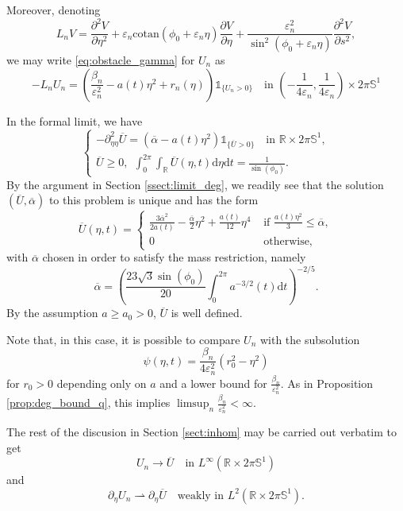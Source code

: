 \documentclass[10pt,a4paper]{article}
\newcommand{\RR}{\mathbb{R}}
\newcommand{\faskip}{\hspace{8pt}}
\numberwithin{equation}{section}
\begin{document}
	Moreover, denoting
	\[
		L_n V =  \frac{\partial^{2} V}{\partial \eta^{2}} + \varepsilon_n \text{cotan}(\phi_0 + \varepsilon_n\eta) \frac{\partial V}{\partial \eta} + \frac{\varepsilon_n^2}{\sin^2(\phi_0 + \varepsilon_n \eta)} \frac{\partial^{2} V}{\partial s^2},
	\]
	we may write \eqref{eq:obstacle_gamma} for $ U_n $ as
	\[
		-L_n	U_n = \left( \frac{\beta_n}{\varepsilon_n^2} - a(t) \eta^2 +r_n(\eta)\right) \mathbb{1}_{\{U_n > 0 \}} \faskip \text{ in } \left(-\frac{1}{4\varepsilon_n}, \frac{1}{4\varepsilon_n}\right) \times 2\pi \mathbb{S}^1
	\]

	In the formal limit, we have
	\[
		\begin{cases}
			-\partial^{2}_{\eta \eta} \overline{U} = \left( \overline{\alpha} - a(t) \eta^2  \right) \mathbb{1}_{\{\overline{U} > 0\}} \faskip \text{ in }\RR \times 2\pi \mathbb{S}^{1},\\ 
			\overline{U} \geq 0,~~ \int_{0}^{2\pi} \int_{\RR} \overline{U}(\eta, t) \mathrm{d}\eta \mathrm{d}t = \frac{1}{\sin(\phi_0)}.
		\end{cases}
	\]
	By the argument in Section \ref{ssect:limit_deg}, we readily see that the solution $ (\overline{U}, \overline{\alpha}) $ to this problem is unique and has the form
	\[
		\overline{U}(\eta, t) = \begin{cases}
			\frac{3 \overline{\alpha}^2}{2a(t)} -\frac{\overline{\alpha}}{2}\eta^2	+\frac{a(t)}{12} \eta^4 & \text{ if } \frac{a(t) \eta^2}{3} \leq \overline{\alpha},\\
			0 & \text{ otherwise,}
	\end{cases}
	\]
	with $ \overline{\alpha} $ chosen in order to satisfy the mass restriction, namely
	\[\overline{\alpha} = \left( \frac{23 \sqrt{3} \sin(\phi_0)}{20} \int_{0}^{2\pi} a^{-3/2}(t)\mathrm{d}t \right)^{-2/5}. \]
	By the assumption $ a \geq a_0 > 0 $, $ \overline{U} $ is well defined.

	Note that, in this case, it is possible to compare $ U_n $ with the subsolution
	\[\psi(\eta, t) = \frac{\beta_n}{4\varepsilon_n^2} (r_0^{2} - \eta^2)\]
	for $ r_0 > 0 $ depending only on $ a $ and a lower bound for $ \frac{\beta_n}{\varepsilon_n^{2}} $. As in Proposition \ref{prop:deg_bound_q}, this implies $ \limsup_n \frac{\beta_n}{\varepsilon_n^2} < \infty$.

	The rest of the discusion in Section \ref{sect:inhom} may be carried out verbatim to get
	\[U_n \rightarrow \overline{U} \faskip \text{ in } L^{\infty}(\RR \times 2\pi\mathbb{S}^1)\]
	and 
	\[\partial_{\eta}U_n \rightharpoonup \partial_{\eta}\overline{U} \faskip \text{ weakly in } L^{2}(\RR \times 2\pi\mathbb{S}^1).\]
\end{document}

